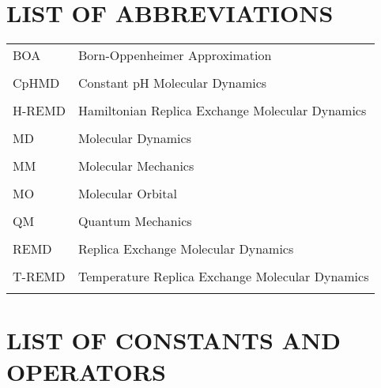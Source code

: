 
\chapter*{LIST OF ABBREVIATIONS}

\singlespacing

\begin{tabular}{lp{5in}}

BOA & Born-Oppenheimer Approximation \\ \\

CpHMD & Constant pH Molecular Dynamics \\ \\

H-REMD & Hamiltonian Replica Exchange Molecular Dynamics \\ \\

MD & Molecular Dynamics \\ \\

MM & Molecular Mechanics \\ \\

MO & Molecular Orbital \\ \\

QM & Quantum Mechanics \\ \\

REMD & Replica Exchange Molecular Dynamics \\ \\

T-REMD & Temperature Replica Exchange Molecular Dynamics \\ \\

\end{tabular}

\chapter*{LIST OF CONSTANTS AND OPERATORS}

